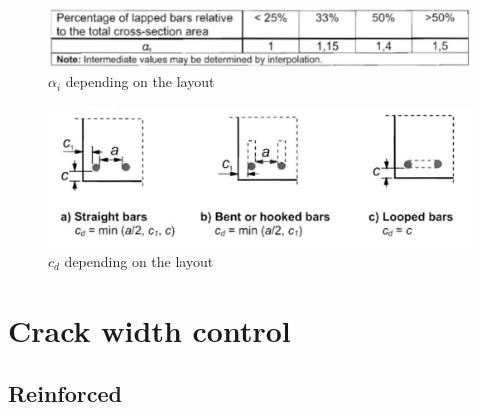 \documentclass[landscape]{article}
\begin{document}
\begin{multicols*}{2}
\begin{figure}[H]
  \includegraphics[width = .9\linewidth]{img/alpha_bis.png}
  \caption{$\alpha_i$ depending on the layout}
  \label{fig:alpha}
\end{figure}
\begin{figure}[H]
  \centering
  \includegraphics[width = .9\linewidth]{img/c_d.png}
  \caption{$c_d$ depending on the layout}
  \label{fig:c_d}
\end{figure}


\section{Crack width control} %
\label{sec:crack_width_control}
\subsection{Reinforced} %
\label{sub:reinforced}


\end{multicols*}
\end{document}
